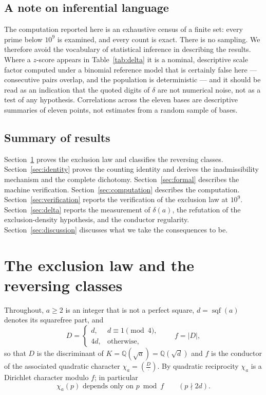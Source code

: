 \documentclass[11pt,reqno]{amsart}
\theoremstyle{plain}
\theoremstyle{definition}
\DeclareMathOperator{\sqf}{sqf}
\newcommand{\Leg}[2]{\left(\frac{#1}{#2}\right)}
\newcommand{\Q}{\mathbb{Q}}
\begin{document}
\subsection*{A note on inferential language}
The computation reported here is an exhaustive census of a finite set: every
prime below $10^9$ is examined, and every count is exact. There is no
sampling. We therefore avoid the vocabulary of statistical inference in
describing the results. Where a $z$-score appears in Table~\ref{tab:delta} it
is a nominal, descriptive scale factor computed under a binomial reference
model that is certainly false here --- consecutive pairs overlap, and the
population is deterministic --- and it should be read as an indication that
the quoted digits of $\delta$ are not numerical noise, not as a test of any
hypothesis. Correlations across the eleven bases are descriptive summaries of
eleven points, not estimates from a random sample of bases.

\subsection*{Summary of results}
Section~\ref{sec:exclusion} proves the exclusion law and classifies the
reversing classes. Section~\ref{sec:identity} proves the counting identity and
derives the inadmissibility mechanism and the complete dichotomy.
Section~\ref{sec:formal} describes the machine verification.
Section~\ref{sec:computation} describes the computation.
Section~\ref{sec:verification} reports the verification of the exclusion law at
$10^9$. Section~\ref{sec:delta} reports the measurement of $\delta(a)$, the
refutation of the exclusion-density hypothesis, and the conductor
regularity. Section~\ref{sec:discussion} discusses what we take the
consequences to be.

\section{The exclusion law and the reversing classes}
\label{sec:exclusion}

Throughout, $a \ge 2$ is an integer that is not a perfect square, $d = \sqf(a)$
denotes its squarefree part, and
\begin{equation}
\label{eq:disc}
  D = \begin{cases} d, & d \equiv 1 \pmod 4,\\ 4d, & \text{otherwise,}\end{cases}
  \qquad f = |D|,
\end{equation}
so that $D$ is the discriminant of $K = \Q(\sqrt{a}) = \Q(\sqrt{d})$ and $f$ is
the conductor of the associated quadratic character
$\chi_a = \Leg{D}{\cdot}$. By quadratic reciprocity $\chi_a$ is a Dirichlet
character modulo $f$; in particular
\begin{equation}
\label{eq:modf}
  \chi_a(p) \text{ depends only on } p \bmod f \qquad (p \nmid 2d).
\end{equation}
\end{document}
